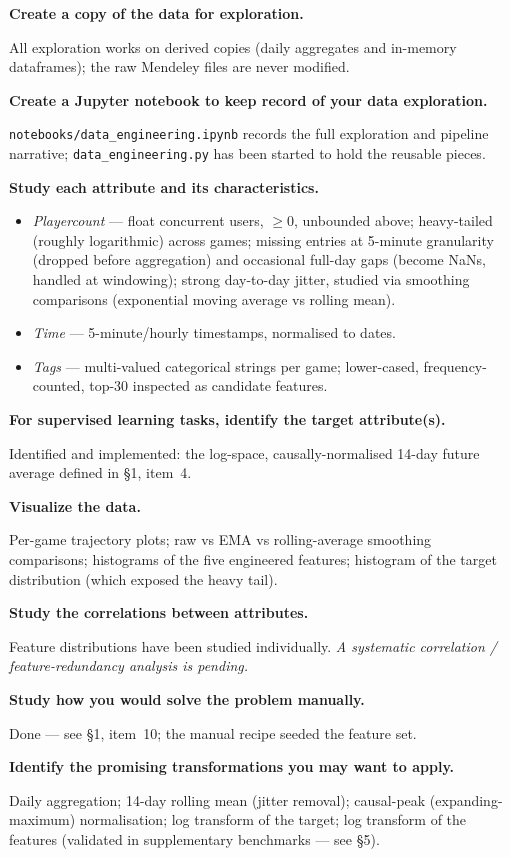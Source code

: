 \documentclass[11pt,a4paper]{article}
\newcommand{\chk}[1]{\item \textbf{#1}\par\nopagebreak\vspace{0.15em}}
\newcommand{\pending}[1][Not yet addressed.]{\textcolor{sttodo}{\itshape #1}}
\begin{document}
\begin{checklist}

\chk{Create a copy of the data for exploration.}
All exploration works on derived copies (daily aggregates and in-memory
dataframes); the raw Mendeley files are never modified.

\chk{Create a Jupyter notebook to keep record of your data exploration.}
\texttt{notebooks/data\_engineering.ipynb} records the full exploration and
pipeline narrative; \texttt{data\_engineering.py} has been started to hold
the reusable pieces.

\chk{Study each attribute and its characteristics.}
\begin{itemize}[leftmargin=1.4em, itemsep=0.2em]
  \item \emph{Playercount} --- float concurrent users, $\ge 0$, unbounded
        above; heavy-tailed (roughly logarithmic) across games; missing
        entries at 5-minute granularity (dropped before aggregation) and
        occasional full-day gaps (become NaNs, handled at windowing);
        strong day-to-day jitter, studied via smoothing comparisons
        (exponential moving average vs rolling mean).
  \item \emph{Time} --- 5-minute/hourly timestamps, normalised to dates.
  \item \emph{Tags} --- multi-valued categorical strings per game;
        lower-cased, frequency-counted, top-30 inspected as candidate
        features.
\end{itemize}

\chk{For supervised learning tasks, identify the target attribute(s).}
Identified and implemented: the log-space, causally-normalised 14-day future
average defined in \S1, item~4.

\chk{Visualize the data.}
Per-game trajectory plots; raw vs EMA vs rolling-average smoothing
comparisons; histograms of the five engineered features; histogram of the
target distribution (which exposed the heavy tail).

\chk{Study the correlations between attributes.}
Feature distributions have been studied individually.
\pending[A systematic correlation / feature-redundancy analysis is pending.]

\chk{Study how you would solve the problem manually.}
Done --- see \S1, item~10; the manual recipe seeded the feature set.

\chk{Identify the promising transformations you may want to apply.}
Daily aggregation; 14-day rolling mean (jitter removal); causal-peak
(expanding-maximum) normalisation; log transform of the target; log
transform of the features (validated in supplementary benchmarks --- see
\S5).


\end{checklist}
\end{document}
